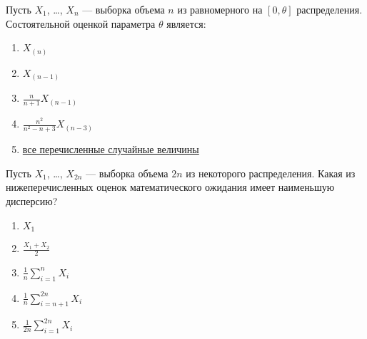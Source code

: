 \documentclass[t]{beamer}
\begin{document}
 \begin{frame} \label{35} 
\begin{block}{35} 

Пусть $X_1$, \ldots, $X_n$ — выборка объема $n$ из равномерного на $[0, \theta]$ распределения. Состоятельной оценкой параметра $\theta$ является:
 


 \end{block} 
\begin{enumerate} 
\item[] \hyperlink{35-No}{\beamergotobutton{} $X_(n)$}
\item[] \hyperlink{35-No}{\beamergotobutton{} $X_(n-1)$}
\item[] \hyperlink{35-No}{\beamergotobutton{} $\frac{n}{n+1} X_{(n-1)}$}
\item[] \hyperlink{35-No}{\beamergotobutton{} $\frac{n^2}{n^2-n+3} X_{(n-3)}$}
\item[] \hyperlink{35-Yes}{\beamergotobutton{} все перечисленные случайные величины}
\end{enumerate} 
\end{frame} 


 \begin{frame} \label{36} 
\begin{block}{36} 

Пусть $X_1$, \ldots, $X_{2 n}$ — выборка объема $2 n$ из некоторого распределения. Какая из нижеперечисленных оценок математического ожидания имеет наименьшую дисперсию?
 


 \end{block} 
\begin{enumerate} 
\item[] \hyperlink{36-No}{\beamergotobutton{} $X_1$}
\item[] \hyperlink{36-No}{\beamergotobutton{} $\frac{X_1+X_2}{2}$}
\item[] \hyperlink{36-No}{\beamergotobutton{} $\frac{1}{n} \sum_{i=1}^n X_i$}
\item[] \hyperlink{36-No}{\beamergotobutton{} $\frac{1}{n} \sum_{i=n+1}^{2 n} X_i$}
\item[] \hyperlink{36-Yes}{\beamergotobutton{} $\frac{1}{2 n} \sum_{i=1}^{2 n} X_i$}
\end{enumerate} 
\end{frame} 
\end{document}
